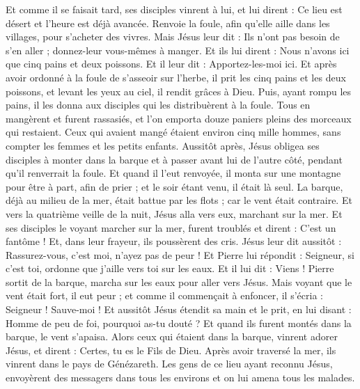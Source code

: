 \begin{multicols}{2}
Et comme il se faisait tard, ses disciples vinrent à lui, et lui dirent : Ce lieu est désert et l'heure est déjà avancée. Renvoie la foule, afin qu'elle aille dans les villages, pour s'acheter des vivres.
Mais Jésus leur dit : Ils n'ont pas besoin de s'en aller ; donnez-leur vous-mêmes à manger.
Et ils lui dirent : Nous n'avons ici que cinq pains et deux poissons.
Et il leur dit : Apportez-les-moi ici.
Et après avoir ordonné à la foule de s'asseoir sur l'herbe, il prit les cinq pains et les deux poissons, et levant les yeux au ciel, il rendit grâces à Dieu. Puis, ayant rompu les pains, il les donna aux disciples qui les distribuèrent à la foule.
Tous en mangèrent et furent rassasiés, et l'on emporta douze paniers pleins des morceaux qui restaient.
Ceux qui avaient mangé étaient environ cinq mille hommes, sans compter les femmes et les petits enfants.
Aussitôt après, Jésus obligea ses disciples à monter dans la barque et à passer avant lui de l'autre côté, pendant qu'il renverrait la foule.
Et quand il l'eut renvoyée, il monta sur une montagne pour être à part, afin de prier ; et le soir étant venu, il était là seul.
La barque, déjà au milieu de la mer, était battue par les flots ; car le vent était contraire.
Et vers la quatrième veille de la nuit, Jésus alla vers eux, marchant sur la mer.
Et ses disciples le voyant marcher sur la mer, furent troublés et dirent : C'est un fantôme ! Et, dans leur frayeur, ils poussèrent des cris.
Jésus leur dit aussitôt : Rassurez-vous, c'est moi, n'ayez pas de peur !
Et Pierre lui répondit : Seigneur, si c'est toi, ordonne que j'aille vers toi sur les eaux.
Et il lui dit : Viens ! Pierre sortit de la barque, marcha sur les eaux pour aller vers Jésus.
Mais voyant que le vent était fort, il eut peur ; et comme il commençait à enfoncer, il s'écria : Seigneur ! Sauve-moi !
Et aussitôt Jésus étendit sa main et le prit, en lui disant : Homme de peu de foi, pourquoi as-tu douté ?
Et quand ils furent montés dans la barque, le vent s'apaisa.
Alors ceux qui étaient dans la barque, vinrent adorer Jésus, et dirent : Certes, tu es le Fils de Dieu.
Après avoir traversé la mer, ils vinrent dans le pays de Génézareth.
Les gens de ce lieu ayant reconnu Jésus, envoyèrent des messagers dans tous les environs et on lui amena tous les malades.

\end{multicols}
